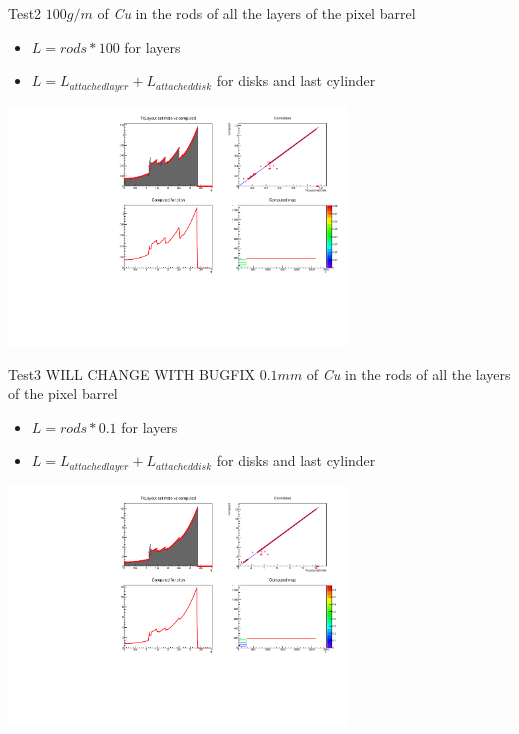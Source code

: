 \documentclass[pdftex, 11pt]{beamer}
\begin{document}
\begin{frame}
  \begin{block}{Test2}
    \alert{$100 g/m$} of \emph{Cu}  in the rods of all the layers of the pixel barrel
    \begin{itemize}
    \item \alert{$L=rods*100$} for layers
    \item \alert{$L=L_{attached layer}+L_{attached disk}$} for disks and last cylinder
    \end{itemize}
  \end{block}
  \begin{center}
    \includegraphics[width=9cm]{img/test2.pdf}
  \end{center}
\end{frame}

\begin{frame}
  \begin{block}{Test3  \alert{WILL CHANGE WITH BUGFIX}}
    \alert{$0.1 mm$} of \emph{Cu}  in the rods of all the layers of the pixel barrel
    \begin{itemize}
    \item \alert{$L=rods*0.1$} for layers
    \item \alert{$L=L_{attached layer}+L_{attached disk}$} for disks and last cylinder
    \end{itemize}
  \end{block}
  \begin{center}
    \includegraphics[width=9cm]{img/test3.pdf}
  \end{center}
\end{frame}
\end{document}
